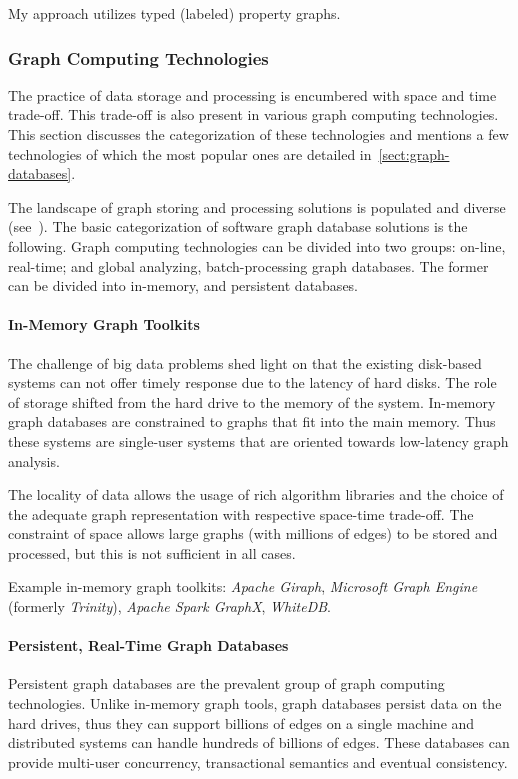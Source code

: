 My approach utilizes typed (labeled) property graphs.

\subsubsection{Graph Computing Technologies}
The practice of data storage and processing is encumbered with space and time trade-off. This trade-off is also present in various graph computing technologies. This section discusses the categorization of these technologies and mentions a few technologies of which the most popular ones are detailed in~\cref{sect:graph-databases}.

The landscape of graph storing and processing solutions is populated and diverse (see~\cite{zhang_-memory_2015}). The basic categorization of software graph database solutions is the following. Graph computing technologies can be divided into two groups: on-line, real-time; and global analyzing, batch-processing graph databases. The former can be divided into in-memory, and persistent databases.

\paragraph{In-Memory Graph Toolkits}
The challenge of big data problems shed light on that the existing disk-based systems can not offer timely response due to the latency of hard disks. The role of storage shifted from the hard drive to the memory of the system. In-memory graph databases are constrained to graphs that fit into the main memory. Thus these systems are single-user systems that are oriented towards low-latency graph analysis.

The locality of data allows the usage of rich algorithm libraries and the choice of the adequate graph representation with respective space-time trade-off. The constraint of space allows large graphs (with millions of edges) to be stored and processed, but this is not sufficient in all cases.

Example in-memory graph toolkits: \emph{Apache Giraph}, \emph{Microsoft Graph Engine} (formerly \emph{Trinity}), \emph{Apache Spark GraphX}, \emph{WhiteDB}.

\paragraph{Persistent, Real-Time Graph Databases}
Persistent graph databases are the prevalent group of graph computing technologies. Unlike in-memory graph tools, graph databases persist data on the hard drives, thus they can support billions of edges on a single machine and distributed systems can handle hundreds of billions of edges. These databases can provide multi-user concurrency, transactional semantics and eventual consistency.

